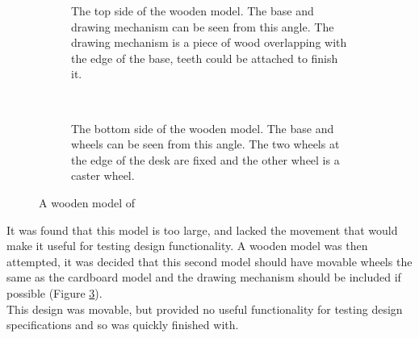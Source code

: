     \begin{figure}[tb]%
        \centering
        \begin{subfigure}[t]{0.45\textwidth}
            \caption{The top side of the wooden model. The base and drawing mechanism can be seen from this angle. The drawing mechanism is a piece of wood overlapping with the edge of the base, teeth could be attached to finish it.}
            \label{fig:wooden model 1}
        \end{subfigure}
        ~
        \begin{subfigure}[t]{0.45\textwidth}
            \caption{The bottom side of the wooden model. The base and wheels can be seen from this angle. The two wheels at the edge of the desk are fixed and the other wheel is a caster wheel.}
            \label{fig:wooden model 2}
        \end{subfigure}
        \caption{A wooden model of \SandE}
        \label{fig:wooden model}
    \end{figure}
	It was found that this model is too large, and lacked the movement that would make it useful for testing design functionality. A wooden model was then attempted, it was decided that this second model should have movable wheels the same as the cardboard model and the drawing mechanism should be included if possible (Figure \ref{fig:wooden model}).\\
    This design was movable, but provided no useful functionality for testing design specifications and so was quickly finished with.

